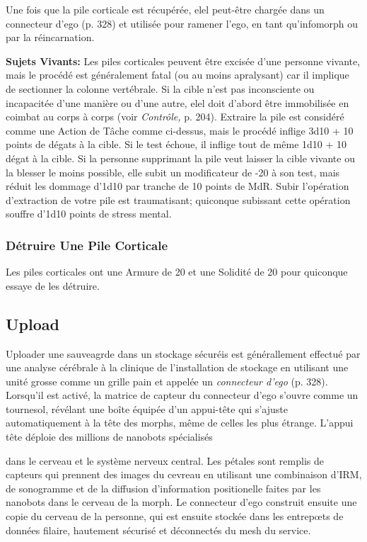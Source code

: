 Une fois que la pile corticale est récupérée, elel peut-être chargée dans un connecteur d'ego (p. 328) et utilisée pour ramener l'ego, en tant qu'infomorph ou par la réincarnation. 

\textbf{Sujets Vivants:} Les piles corticales peuvent être excisée d'une personne vivante, mais le procédé est généralement fatal (ou au moins apralysant) car il implique de sectionner la colonne vertébrale. Si la cible n'est pas inconsciente ou incapacitée d'une manière ou d'une autre, elel doit d'abord être immobilisée en coimbat au corps à corps (voir \textit{Contrôle, } p. 204). Extraire la pile est considéré comme une Action de Tâche comme ci-dessus, mais le procédé inflige 3d10 + 10 points de dégats à la cible. Si le test échoue, il inflige tout de même 1d10 + 10 dégat à la cible. Si la personne supprimant la pile veut laisser la cible vivante ou la blesser le moins possible, elle subit un modificateur de -20 à son test, mais réduit les dommage d'1d10 par tranche de 10 points de MdR. Subir l'opération d'extraction de votre pile est traumatisant; quiconque subissant cette opération souffre d'1d10 points de stress mental. 

\subsubsection{Détruire Une Pile Corticale} 

Les piles corticales ont une Armure de 20 et une Solidité de 20 pour quiconque essaye de les détruire. 

\subsection{Upload} 

Uploader une sauveagrde dans un stockage sécuréis est générallement effectué par une analyse cérébrale à la clinique de l'installation de stockage en utilisant une unité grosse comme un grille pain et appelée un \textit{connecteur d'ego} (p. 328). Lorsqu'il est activé, la matrice de capteur du connecteur d'ego s'ouvre comme un tournesol, révélant une boîte équipée d'un appui-tête qui s'ajuste automatiquement à la tête des morphs, même de celles les plus étrange. L'appui tête déploie des millions de nanobots spécialisés 

dans le cerveau et le système nerveux central. Les pétales sont remplis de capteurs qui prennent des images du cevreau en utilisant une combinaison d'IRM, de sonogramme et de la diffusion d'information positionelle faites par les nanobots dans le cerveau de la morph. Le connecteur d'ego construit ensuite une copie du cerveau de la personne, qui est ensuite stockée dans les entrepœts de données filaire, hautement sécurisé et déconnectés du mesh du service. 

